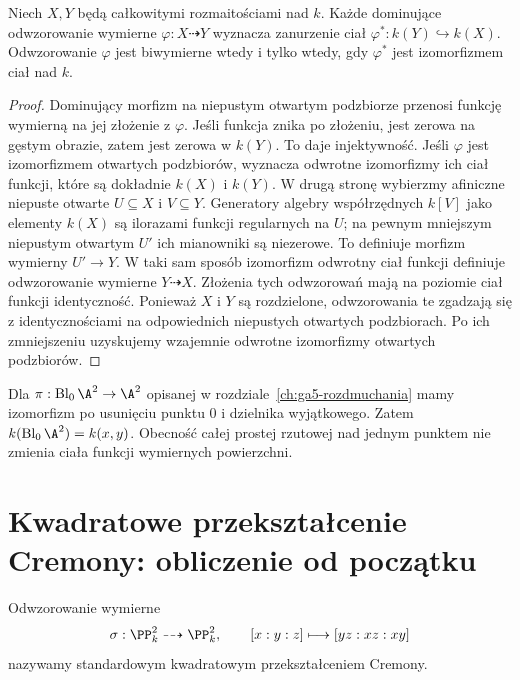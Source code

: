 \begin{twierdzenie}
\label{tw:ga8-function-fields}
Niech $X,Y$ będą całkowitymi rozmaitościami nad $k$.
Każde dominujące odwzorowanie wymierne
$\varphi:X\dashrightarrow Y$ wyznacza zanurzenie ciał
$\varphi^*:k(Y)\hookrightarrow k(X)$.
Odwzorowanie $\varphi$ jest biwymierne wtedy i tylko
wtedy, gdy $\varphi^*$ jest izomorfizmem ciał nad $k$.
\end{twierdzenie}
\begin{proof}
Dominujący morfizm na niepustym otwartym podzbiorze
przenosi funkcję wymierną na jej złożenie z $\varphi$.
Jeśli funkcja znika po złożeniu, jest zerowa na gęstym
obrazie, zatem jest zerowa w $k(Y)$. To daje injektywność.
Jeśli $\varphi$ jest izomorfizmem otwartych podzbiorów,
wyznacza odwrotne izomorfizmy ich ciał funkcji, które
są dokładnie $k(X)$ i $k(Y)$.
W drugą stronę wybierzmy afiniczne niepuste otwarte
$U\subseteq X$ i $V\subseteq Y$. Generatory algebry
współrzędnych $k[V]$ jako elementy $k(X)$ są ilorazami
funkcji regularnych na $U$; na pewnym mniejszym
niepustym otwartym $U'$ ich mianowniki są niezerowe.
To definiuje morfizm wymierny $U'\to Y$.
W taki sam sposób izomorfizm odwrotny ciał funkcji
definiuje odwzorowanie wymierne $Y\dashrightarrow X$.
Złożenia tych odwzorowań mają na poziomie ciał funkcji
identyczność. Ponieważ $X$ i $Y$ są rozdzielone,
odwzorowania te zgadzają się z identycznościami na
odpowiednich niepustych otwartych podzbiorach.
Po ich zmniejszeniu uzyskujemy wzajemnie odwrotne
izomorfizmy otwartych podzbiorów.
\end{proof}

\begin{przyklad}
Dla $\pi:\operatorname{Bl}_0\A^2\to\A^2$ opisanej
w rozdziale~\ref{ch:ga5-rozdmuchania} mamy izomorfizm
po usunięciu punktu $0$ i dzielnika wyjątkowego.
Zatem $k(\operatorname{Bl}_0\A^2)=k(x,y)$.
Obecność całej prostej rzutowej nad jednym punktem
nie zmienia ciała funkcji wymiernych powierzchni.
\end{przyklad}

\section{Kwadratowe przekształcenie Cremony: obliczenie od początku}
\label{sec:ga8-cremona}

\begin{definicja}
\label{def:ga8-cremona}
Odwzorowanie wymierne
\[
\sigma:\PP^2_k\dashrightarrow\PP^2_k,\qquad
[x:y:z]\longmapsto[yz:xz:xy]
\]
nazywamy standardowym kwadratowym przekształceniem Cremony.
\end{definicja}

